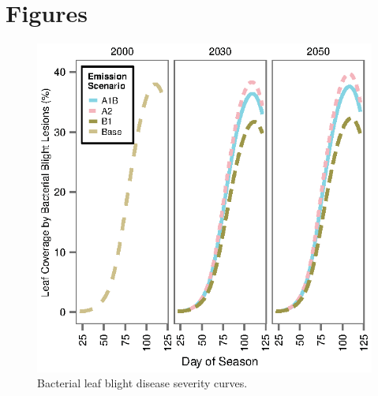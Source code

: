 \documentclass[preprint,12pt]{elsarticle}
\begin{document}
\section{Figures}
\label{Figures}
\begin{figure}[htb]
  \caption{Bacterial leaf blight disease severity curves.}
  \includegraphics[width = 1\textwidth]{figures/BB}
\end{figure}












\end{document}
